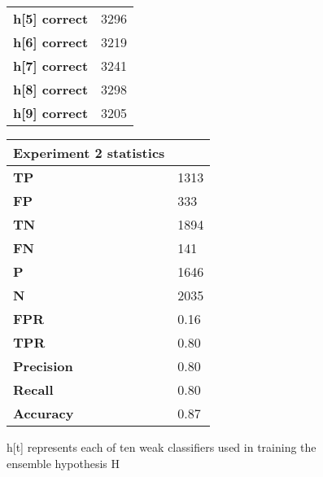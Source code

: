 \documentclass[titlepage,11pt]{article}
\begin{document}
{\begin{figure}[h]
\begin{tabular}{|l|l|}
\textbf{ h[5] correct } & 3296 \\
\textbf{ h[6] correct } & 3219 \\
\textbf{ h[7] correct } & 3241 \\
\textbf{ h[8] correct } & 3298 \\
\textbf{ h[9] correct } & 3205 \\
\hline
\end{tabular}
\hspace{5pt}
\vspace{2pt}
\begin{tabular}{|l|l|}
\hline
\textbf{Experiment 2 statistics} & \\
\hline
\textbf{ TP } & 1313 \\
\textbf{ FP } & 333 \\
\textbf{ TN } & 1894 \\
\textbf{ FN } & 141 \\
\textbf{ P } &  1646 \\
\textbf{ N } & 2035 \\
\textbf{ FPR } & 0.16 \\
\textbf{ TPR } & 0.80 \\
\hline
\textbf{ Precision } & 0.80\\
\textbf{ Recall    } & 0.80\\
\textbf{ Accuracy  } & 0.87\\
\hline
\end{tabular}
\caption{h[t] represents each of ten weak classifiers used in training the ensemble hypothesis H}
\end{figure}

}

\pagebreak
\end{document}
